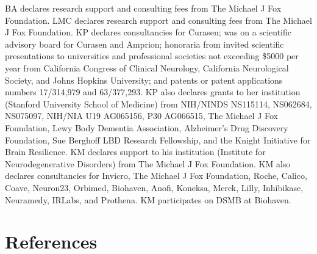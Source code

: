 \documentclass[
  table]{article}
\begin{document}
BA declares research support and consulting fees from The Michael J Fox
Foundation. LMC declares research support and consulting fees from The
Michael J Fox Foundation. KP declares consultancies for Curasen; was on
a scientific advisory board for Curasen and Amprion; honoraria from
invited scientific presentations to universities and professional
societies not exceeding \$5000 per year from California Congress of
Clinical Neurology, California Neurological Society, and Johns Hopkins
University; and patents or patent applications numbers 17/314,979 and
63/377,293. KP also declares grants to her institution (Stanford
University School of Medicine) from NIH/NINDS NS115114, NS062684,
NS075097, NIH/NIA U19 AG065156, P30 AG066515, The Michael J Fox
Foundation, Lewy Body Dementia Association, Alzheimer's Drug Discovery
Foundation, Sue Berghoff LBD Research Fellowship, and the Knight
Initiative for Brain Resilience. KM declares support to his institution
(Institute for Neurodegenerative Disorders) from The Michael J Fox
Foundation. KM also declares consultancies for Invicro, The Michael J
Fox Foundation, Roche, Calico, Coave, Neuron23, Orbimed, Biohaven,
Anofi, Koneksa, Merck, Lilly, Inhibikase, Neuramedy, IRLabs, and
Prothena. KM participates on DSMB at Biohaven.

\section*{References}\label{references}
\end{document}
